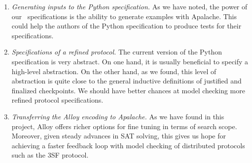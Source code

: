 
\begin{enumerate}

  \item \emph{Generating inputs to the Python specification.} As we have noted,
    the power of our~\tlap{} specifications is the ability to generate examples
    with Apalache. This could help the authors of the Python specification to
    produce tests for their specifications.

  \item \emph{Specifications of a refined protocol.} The current version of
    the Python specification is very abstract. On one hand, it is usually
    beneficial to specify a high-level abstraction. On the other hand, as we
    found, this level of abstraction is quite close to the general inductive
    definitions of justified and finalized checkpoints. We should have better
    chances at model checking more refined protocol specifications.

  \item \emph{Transferring the Alloy encoding to Apalache.} As we have found in
    this project, Alloy offers richer options for fine tuning in terms of
    search scope. Moreover, given steady advances in SAT solving, this gives us
    hope for achieving a faster feedback loop with model checking of
    distributed protocols such as the 3SF protocol.

\end{enumerate}

